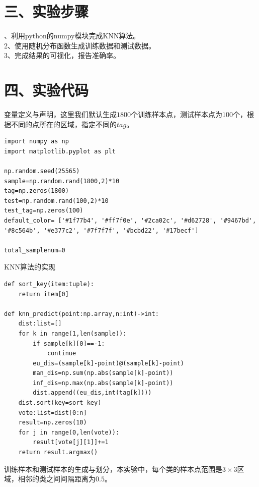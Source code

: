 \documentclass{article}
\begin{document}
\section*{\LARGE 三、实验步骤}、利用python的numpy模块完成KNN算法。\\
2、使用随机分布函数生成训练数据和测试数据。\\
3、完成结果的可视化，报告准确率。\\

\section*{\LARGE 四、实验代码}\noindent
变量定义与声明，这里我们默认生成$1800$个训练样本点，测试样本点为$100$个，根据不同的点所在的区域，指定不同的$tag$。
\begin{verbatim}
import numpy as np
import matplotlib.pyplot as plt

np.random.seed(25565)
sample=np.random.rand(1800,2)*10
tag=np.zeros(1800)
test=np.random.rand(100,2)*10
test_tag=np.zeros(100)
default_color= ['#1f77b4', '#ff7f0e', '#2ca02c', '#d62728', '#9467bd', '#8c564b', '#e377c2', '#7f7f7f', '#bcbd22', '#17becf']

total_samplenum=0
\end{verbatim}
\noindent KNN算法的实现
\begin{verbatim}
def sort_key(item:tuple):
    return item[0]

def knn_predict(point:np.array,n:int)->int:
    dist:list=[]
    for k in range(1,len(sample)):
        if sample[k][0]==-1:
            continue
        eu_dis=(sample[k]-point)@(sample[k]-point)
        man_dis=np.sum(np.abs(sample[k]-point))
        inf_dis=np.max(np.abs(sample[k]-point))
        dist.append((eu_dis,int(tag[k])))
    dist.sort(key=sort_key)
    vote:list=dist[0:n]
    result=np.zeros(10)
    for j in range(0,len(vote)):
        result[vote[j][1]]+=1
    return result.argmax()
\end{verbatim}
\noindent 训练样本和测试样本的生成与划分，本实验中，每个类的样本点范围是$3\times 3$区域，相邻的类之间间隔距离为$0.5$。
\end{document}
